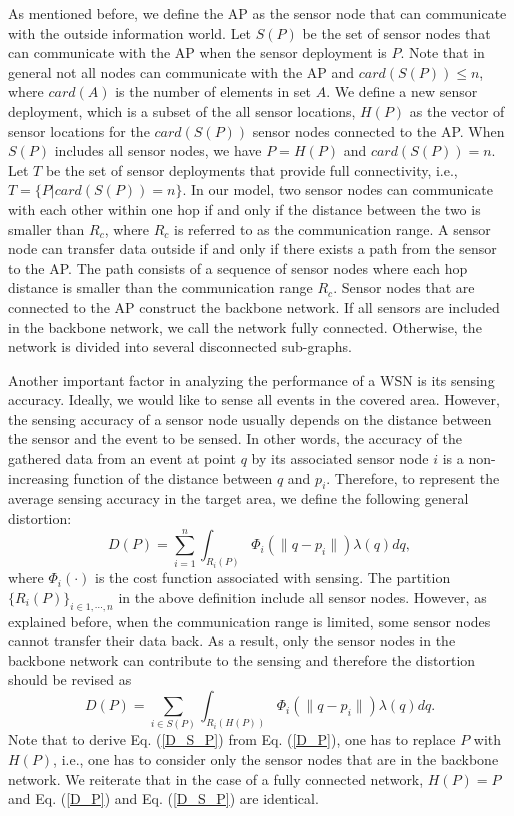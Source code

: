 \documentclass[journal,draftcls,onecolumn,12pt,twoside, narroweqnarray]{IEEEtran}
\begin{document}
As mentioned before, we define the AP as the sensor node that can communicate with the outside information world.
Let $S(P)$ be the set of sensor nodes that can communicate with the AP when the sensor deployment is $P$. Note that in general not all nodes can communicate with the AP and  $card(S(P))\leq n$, where $card(A)$ is the number of elements in set $A$. We define a new sensor deployment, which is a subset of the all sensor locations, $H(P)$ as the vector of sensor locations for the $card(S(P))$ sensor nodes connected to the AP. When $S(P)$ includes all sensor nodes, we have $P=H(P)$ and $card(S(P))= n$. Let $T$ be the set of sensor deployments that provide full connectivity, i.e., $T=\{P|card(S(P))=n\}$. In our model, two sensor nodes can communicate with each other within one hop if and only if the distance between the two is smaller than $R_c$, where $R_c$ is referred to as the communication range.
A sensor node can transfer data outside if and only if there exists a path from the sensor to the AP. The path consists of a sequence of sensor nodes where each hop distance is smaller than the communication range $R_c$.
Sensor nodes that are connected to the AP construct the backbone network. If all sensors are included in the backbone network, we call the network fully connected. Otherwise, the network is divided into several disconnected sub-graphs.










Another important factor in analyzing the performance of a WSN is its sensing accuracy. Ideally, we would like to sense all events in the covered area. However, the sensing accuracy of a sensor node usually depends on the distance between the sensor and the event to be sensed.
In other words, the accuracy of the gathered data from an event at point $q$ by its associated sensor node $i$ is a non-increasing function of the distance between $q$ and $p_i$.
Therefore, to represent the average sensing accuracy in the target area, we define the following  general distortion:
\begin{equation}
    D(P) = \sum_{i=1}^n \int_{R_i(P)} \Phi_i(\|q-p_i\|) \lambda(q)dq,\label{D_P}
\end{equation}
where $\Phi_i(\cdot)$ is the cost function associated with sensing.
The partition $\{R_i(P)\}_{i\in1,\cdots,n}$ in the above definition include all sensor nodes. However, as explained before, when the communication range is limited, some sensor nodes cannot transfer their data back. As a result, only the sensor nodes in the backbone network can contribute to the sensing and therefore the distortion should be revised as
\begin{equation}
    D(P) = \sum_{i\in S(P)} \int_{R_i(H(P))} \Phi_i(\|q-p_i\|) \lambda(q)dq.\label{D_S_P}
\end{equation}
Note that to derive Eq. (\ref{D_S_P}) from Eq. (\ref{D_P}), one has to replace $P$ with $H(P)$, i.e., one has to consider only the sensor nodes that are in the backbone network.
We reiterate that in the case of a fully connected network, $H(P)=P$ and Eq. (\ref{D_P}) and Eq. (\ref{D_S_P}) are identical.
\end{document}
